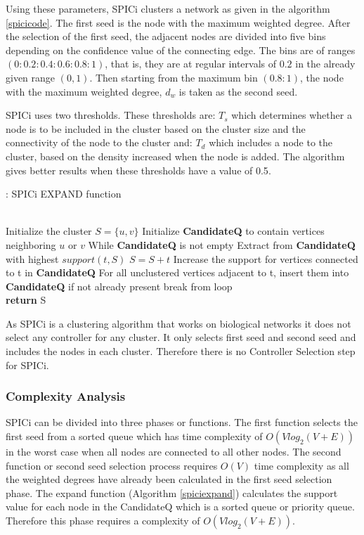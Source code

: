 \documentclass[a4paper,twocolumn,preprint]{elsarticle}
\begin{document}
Using these parameters, SPICi clusters a network as given in the algorithm \ref{spicicode}.
The first seed is the node with the maximum weighted degree. 
After the selection of the first seed, the adjacent nodes are divided into five bins depending on the confidence value of the connecting edge. The bins are of ranges $(0:0.2:0.4:0.6:0.8:1)$, that is, they are at regular intervals of $0.2$ in the already given range $(0,1)$. Then starting from the maximum bin $(0.8:1)$, the node with the maximum weighted degree, $d_w$ is taken as the second seed.

SPICi uses two thresholds. These thresholds are: $T_s$ which determines whether a node is to be included in the cluster based on the cluster size and the connectivity of the node to the cluster and: $T_d$ which includes a node to the cluster, based on the density increased when the node is added. The algorithm gives better results when these thresholds have a value of 0.5\cite{spici2010}.

\begin{algorithm}
	\caption{: SPICi EXPAND function}\label{spiciexpand}
	\begin{algorithmic}[1]
		\\
		Initialize the cluster $S=\{u,v\}$
		Initialize \textbf{CandidateQ} to contain vertices neighboring $u$ or $v$
		While \textbf{CandidateQ} is not empty
		\State Extract from \textbf{CandidateQ} with highest $support(t,S)$
		\State $S=S+{t}$
		\State Increase the support for vertices connected to t in
		\textbf{CandidateQ}
		\State For all unclustered vertices adjacent to t, insert them
		into \textbf{CandidateQ} if not already present
		\Else
		\State break from loop
		\EndIf \\
		\textbf{return} S
		\EndProcedure
	\end{algorithmic}
\end{algorithm}

As SPICi is a clustering algorithm that works on biological networks it does not select any controller for any cluster. It only selects first seed and second seed and includes the nodes in each cluster. Therefore there is no Controller Selection step for SPICi.

\subsubsection{Complexity Analysis}
SPICi can be divided into three phases or functions. The first function selects the first seed from a sorted queue which has time complexity of $O(Vlog_2(V+E))$ in the worst case when all nodes are connected to all other nodes. The second function or second seed selection process requires $O(V)$ time complexity as all the weighted degrees have already been calculated in the first seed selection phase. The expand function (Algorithm \ref{spiciexpand}) calculates the support value for each node in the CandidateQ which is a sorted queue or priority queue. Therefore this phase requires a complexity of $O(Vlog_2(V+E))$.
\end{document}

